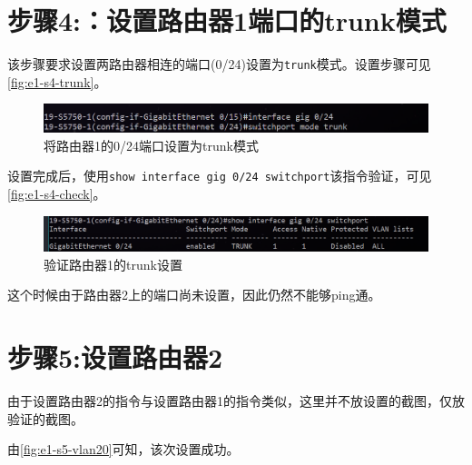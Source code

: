 \documentclass{myreport}
\begin{document}
\section{步骤4:：设置路由器1端口的trunk模式}

该步骤要求设置两路由器相连的端口(0/24)设置为\texttt{trunk}模式。设置步骤可见\autoref{fig:e1-s4-trunk}。

\begin{figure}[!htp]
    \centering
    \includegraphics[width=13cm]{"./figure/2018-05-04-09-23-00.png"}
    \caption{将路由器1的0/24端口设置为trunk模式}
    \label{fig:e1-s4-trunk}
\end{figure}

设置完成后，使用\texttt{show interface gig 0/24 switchport}该指令验证，可见\autoref{fig:e1-s4-check}。

\begin{figure}[!htp]
    \centering
    \includegraphics[width=13cm]{"./figure/2018-05-04-09-23-29.png"}
    \caption{验证路由器1的trunk设置}
    \label{fig:e1-s4-check}
\end{figure}


这个时候由于路由器2上的端口尚未设置，因此仍然不能够ping通。

\section{步骤5:设置路由器2}

由于设置路由器2的指令与设置路由器1的指令类似，这里并不放设置的截图，仅放验证的截图。

由\autoref{fig:e1-s5-vlan20}可知，该次设置成功。
\end{document}
